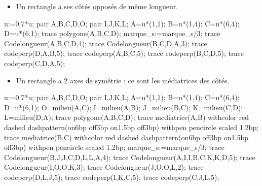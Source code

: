 \begin{changemargin}{-5mm}{-15mm}
    \begin{propriete}[\admise]
        \begin{minipage}[t]{0.25\linewidth}
            \begin{itemize}
                \item Un rectangle a ses côtés opposés de même longueur.
            \end{itemize}
            \begin{Geometrie}[CoinHD={(4.9u,3.5u)}]
                u:=0.7*u;
                pair A,B,C,D,O;
                pair I,J,K,L;
                A=u*(1,1);
                B=u*(1,4);
                C=u*(6,4);
                D=u*(6,1);
                trace polygone(A,B,C,D);
                marque_s:=marque_s/3;
                trace Codelongueur(A,B,C,D,4);
                trace Codelongueur(B,C,D,A,3);
                trace codeperp(D,A,B,5);
                trace codeperp(A,B,C,5);
                trace codeperp(B,C,D,5);
                trace codeperp(C,D,A,5);
            \end{Geometrie}
        \end{minipage}
        \hfill
        \begin{minipage}[t]{0.35\linewidth}
            \begin{itemize}
                \item Un rectangle a 2 axes de symétrie : ce sont les médiatrices des côtés.
            \end{itemize}
            \begin{Geometrie}[CoinHD={(4.9u,3.5u)}]
                u:=0.7*u;
                pair A,B,C,D,O;
                pair I,J,K,L;
                A=u*(1,1);
                B=u*(1,4);
                C=u*(6,4);
                D=u*(6,1);
                O=milieu(A,C);
                I=milieu(A,B);
                J=milieu(B,C);
                K=milieu(C,D);
                L=milieu(D,A);
                trace polygone(A,B,C,D);
                trace mediatrice(A,B) withcolor red dashed dashpattern(on6bp off3bp on1.5bp off3bp) withpen pencircle scaled 1.2bp;
                trace mediatrice(B,C) withcolor red dashed dashpattern(on6bp off3bp on1.5bp off3bp) withpen pencircle scaled 1.2bp;
                marque_s:=marque_s/3;
                trace Codelongueur(B,J,J,C,D,L,L,A,4);
                trace Codelongueur(A,I,I,B,C,K,K,D,5);
                trace Codelongueur(I,O,O,K,3);
                trace Codelongueur(J,O,O,L,2);
                trace codeperp(D,L,J,5);
                trace codeperp(I,K,C,5);
                trace codeperp(C,J,L,5);

\end{Geometrie}
\end{minipage}
\end{propriete}
\end{changemargin}
